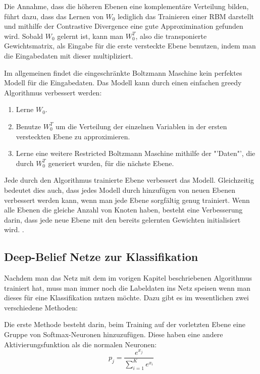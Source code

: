 \documentclass[12pt]{article}
\begin{document}
Die Annahme, dass die höheren Ebenen eine komplementäre Verteilung bilden, führt dazu, dass das Lernen von $W_0$ lediglich das Trainieren einer RBM darstellt und mithilfe der Contrastive Divergence eine gute Approximination gefunden wird. Sobald $W_0$ gelernt ist, kann man $W^T_0$, also die transponierte Gewichtsmatrix, als Eingabe für die erste versteckte Ebene benutzen, indem man die Eingabedaten mit dieser multipliziert.

Im allgemeinen findet die eingeschränkte Boltzmann Maschine kein perfektes Modell für die Eingabedaten. Das Modell kann durch einen einfachen greedy Algorithmus verbessert werden:
 
\begin{enumerate}
\item Lerne $W_0$.
\item Benutze $W_0^T$ um die Verteilung der einzelnen Variablen in der ersten versteckten Ebene zu approximieren.
\item Lerne eine weitere Restricted Boltzmann Maschine  mithilfe der "'Daten"', die durch $W_0^T$ generiert wurden, für die nächste Ebene.
\end{enumerate}



Jede durch den Algorithmus trainierte Ebene verbessert das Modell. Gleichzeitig bedeutet dies auch, dass jedes Modell durch hinzufügen von neuen Ebenen verbessert werden kann, wenn man jede Ebene sorgfältig genug trainiert. Wenn alle Ebenen die gleiche Anzahl von Knoten haben, besteht eine Verbesserung darin, dass jede neue Ebene mit den bereits gelernten Gewichten initialisiert wird. \cite{learning}.

\subsection{Deep-Belief Netze zur Klassifikation}
Nachdem man das Netz mit dem im vorigen Kapitel beschriebenen Algorithmus trainiert hat, muss man immer noch die Labeldaten ins Netz speisen wenn man dieses für eine Klassifikation nutzen möchte. Dazu gibt es im wesentlichen zwei verschiedene Methoden:

Die erste Methode besteht darin, beim Training auf der vorletzten Ebene eine Gruppe von Softmax-Neuronen hinzuzufügen. Diese haben eine andere Aktivierungsfunktion als die normalen Neuronen: 
\begin{equation}
p_j = \frac{e^{x_j}}{\sum_{i=1}^K e^{x_i}}
\end{equation}
\end{document}
